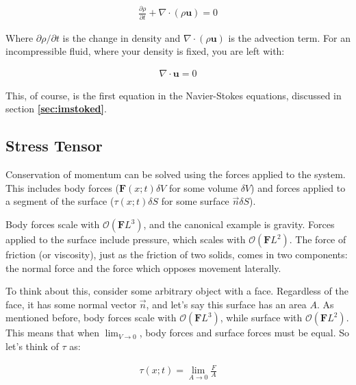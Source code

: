 \documentclass[12pt]{report}
\begin{document}
\begin{equation} \label{phenom1}
\begin{split}
\frac{\partial \rho}{\partial t} + \nabla \cdot (\rho \mathbf{u}) = 0
\end{split}
\end{equation}

Where $\partial \rho / \partial t$ is the change in density and $\nabla \cdot (\rho \mathbf{u})$ is the advection term. For an incompressible fluid, where your density is fixed, you are left with:

\begin{equation} \label{phenom1}
\begin{split}
 \nabla \cdot \mathbf{u} = 0
\end{split}
\end{equation}

This, of course, is the first equation in the Navier-Stokes equations, discussed in section \textbf{\ref{sec:imstoked}}.\newline

\subsection{Stress Tensor}

Conservation of momentum can be solved using the forces applied to the system. This includes body forces ($\mathbf{F}(x;t)\delta V$ for some volume $\delta V$) and forces applied to a segment of the surface ($\tau(x;t)\delta S$ for some surface $\Vec{n}\delta S$).\newline 

Body forces scale with $\mathcal{O} (\mathbf{F}L^3)$, and the canonical example is gravity. Forces applied to the surface include pressure, which scales with $\mathcal{O} (\mathbf{F}L^2)$. The force of friction (or viscosity), just as the friction of two solids, comes in two components: the normal force and the force which opposes movement laterally. \newline

To think about this, consider some arbitrary object with a face. Regardless of the face, it has some normal vector $\Vec{n}$, and let's say this surface has an area $A$. As mentioned before, body forces scale with $\mathcal{O} (\mathbf{F}L^3)$, while surface with $\mathcal{O} (\mathbf{F}L^2)$. This means that when $\lim_{V\to 0}$, body forces and surface forces must be equal. So let's think of $\tau$ as:

\begin{equation} \label{phenom1}
\begin{split}
 \tau(x;t) = \lim_{A\to 0}\frac{F}{A}
\end{split}
\end{equation}
\end{document}
